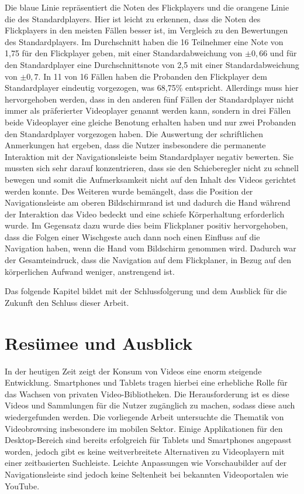 \documentclass[11pt,a4paper]{report}
\begin{document}
Die blaue Linie repräsentiert die Noten des Flickplayers und die orangene Linie die des Standardplayers. Hier ist leicht zu erkennen, dass die Noten des Flickplayers in den meisten Fällen besser ist, im Vergleich zu den Bewertungen des Standardplayers. Im Durchschnitt haben die 16 Teilnehmer eine Note von 1,75 für den Flickplayer geben, mit einer Standardabweichung von  $\pm 0,66$ und für den Standardplayer eine Durchschnittsnote von 2,5 mit einer Standardabweichung von  $\pm 0,7$. In 11 von 16 Fällen haben die Probanden den Flickplayer dem Standardplayer eindeutig vorgezogen, was 68,75\% entspricht. Allerdings muss hier hervorgehoben werden, dass in den anderen fünf Fällen der Standardplayer nicht immer als präferierter Videoplayer genannt werden kann, sondern in drei Fällen beide Videoplayer eine gleiche Benotung erhalten haben und nur zwei Probanden den Standardplayer vorgezogen haben. Die Auswertung der schriftlichen Anmerkungen hat ergeben, dass die Nutzer insbesondere die permanente Interaktion mit der Navigationsleiste beim Standardplayer negativ bewerten. Sie mussten sich sehr darauf konzentrieren, dass sie den Schieberegler nicht zu schnell bewegen und somit die Aufmerksamkeit nicht auf den Inhalt des Videos gerichtet werden konnte. Des Weiteren wurde bemängelt, dass die Position der Navigationsleiste am oberen Bildschirmrand ist und dadurch die Hand während der Interaktion das Video bedeckt und eine schiefe Körperhaltung erforderlich wurde. Im Gegensatz dazu wurde dies beim Flickplaner positiv hervorgehoben, dass die Folgen einer Wischgeste auch dann noch einen Einfluss auf die Navigation haben, wenn die Hand vom Bildschirm genommen wird. Dadurch war der Gesamteindruck, dass die Navigation auf dem Flickplaner, in Bezug auf den körperlichen Aufwand weniger, anstrengend ist.

Das folgende Kapitel bildet mit der Schlussfolgerung und dem Ausblick für die Zukunft den Schluss dieser Arbeit.

\chapter{Resümee und Ausblick}

In der heutigen Zeit zeigt der Konsum von Videos eine enorm steigende Entwicklung. Smartphones und Tablets tragen hierbei eine erhebliche Rolle für das Wachsen von privaten Video-Bibliotheken. Die Herausforderung ist es diese Videos und Sammlungen für die Nutzer zugänglich zu machen, sodass diese auch wiedergefunden werden. Die vorliegende Arbeit untersuchte die Thematik von Videobrowsing insbesondere im mobilen Sektor. Einige Applikationen für den Desktop-Bereich sind bereits erfolgreich für Tablets und Smartphones angepasst worden, jedoch gibt es keine weitverbreitete Alternativen zu Videoplayern mit einer zeitbasierten Suchleiste. Leichte Anpassungen wie Vorschaubilder auf der Navigationsleiste sind jedoch keine Seltenheit bei bekannten Videoportalen wie YouTube.
\end{document}
